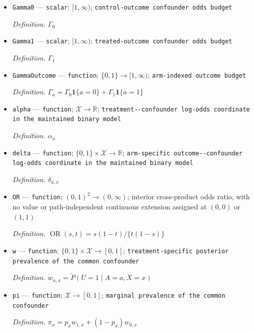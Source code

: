 \documentclass{article}
\begin{document}
\begin{itemize}
  \par\smallskip\noindent\emph{Definition.} \(\Gamma_A\)
  \item \texttt{Gamma0} --- \texttt{scalar}; \([1,\infty)\); \texttt{control-\allowbreak{}outcome confounder odds budget}
  \par\smallskip\noindent\emph{Definition.} \(\Gamma_0\)
  \item \texttt{Gamma1} --- \texttt{scalar}; \([1,\infty)\); \texttt{treated-\allowbreak{}outcome confounder odds budget}
  \par\smallskip\noindent\emph{Definition.} \(\Gamma_1\)
  \item \texttt{GammaOutcome} --- \texttt{function}; \(\{0,1\}\to[1,\infty)\); \texttt{arm-\allowbreak{}indexed outcome budget}
  \par\smallskip\noindent\emph{Definition.} \(\Gamma_a=\Gamma_0\mathbf 1\{a=0\}+\Gamma_1\mathbf 1\{a=1\}\)
  \item \texttt{alpha} --- \texttt{function}; \(\mathcal X\to\mathbb R\); \texttt{treatment-\allowbreak{}-\allowbreak{}confounder log-\allowbreak{}odds coordinate in the maintained binary model}
  \par\smallskip\noindent\emph{Definition.} \(\alpha_x\)
  \item \texttt{delta} --- \texttt{function}; \(\{0,1\}\times\mathcal X\to\mathbb R\); \texttt{arm-\allowbreak{}specific outcome-\allowbreak{}-\allowbreak{}confounder log-\allowbreak{}odds coordinate in the maintained binary model}
  \par\smallskip\noindent\emph{Definition.} \(\delta_{a,x}\)
  \item \texttt{OR} --- \texttt{function}; \((0,1)^2\to(0,\infty)\); interior cross-product odds ratio, with no value or path-independent continuous extension assigned at \((0,0)\) or \((1,1)\)
  \par\smallskip\noindent\emph{Definition.} \(\operatorname{OR}(s,t)=s(1-t)/\{t(1-s)\}\)
  \item \texttt{w} --- \texttt{function}; \(\{0,1\}\times\mathcal X\to[0,1]\); \texttt{treatment-\allowbreak{}specific posterior prevalence of the common confounder}
  \par\smallskip\noindent\emph{Definition.} \(w_{a,x}=\widetilde P(U=1\mid A=a,X=x)\)
  \item \texttt{pi} --- \texttt{function}; \(\mathcal X\to[0,1]\); \texttt{marginal prevalence of the common confounder}
  \par\smallskip\noindent\emph{Definition.} \(\pi_x=p_xw_{1,x}+(1-p_x)w_{0,x}\)

\end{itemize}
\end{document}
